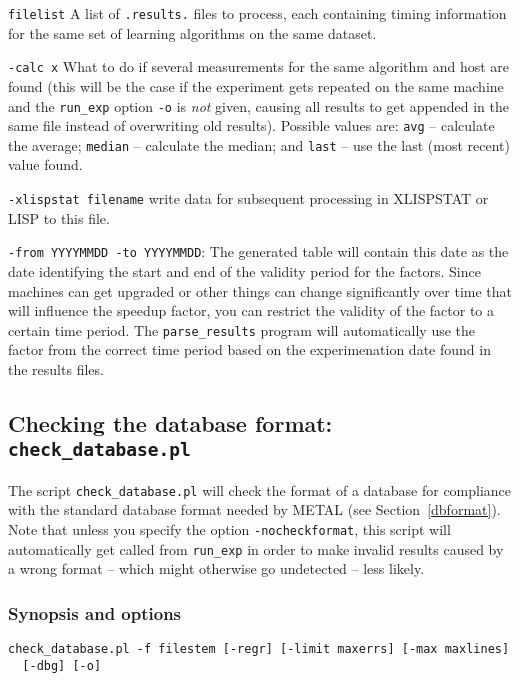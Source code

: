 \documentclass[a4paper,10pt,twoside]{article}
\newenvironment{optionlist}
{\begin{list}{}
    {\setlength{\itemsep}{0em plus0em minus0ex}
      \setlength{\parsep}{0ex}
      \setlength{\topsep}{0em}
      \setlength{\leftmargin}{2em}
      \setlength{\listparindent}{0em}
      \setlength{\itemindent}{-2em}
      \setlength{\partopsep}{0ex}
    }}
  {\end{list}}
\begin{document}
\begin{optionlist}
\item \verb=filelist= A list of \verb=.results.= files to process, each 
containing timing information for the same set of learning algorithms
on the same dataset. 
\item \verb=-calc x= What to do if several measurements for the
same algorithm and host are found (this will be the case if the 
experiment gets repeated on the same machine and the \verb=run_exp=
option \verb=-o= is \emph{not} given, causing all results to get
appended in the same file instead of overwriting old results).
Possible values are: \verb=avg= -- calculate the average; \verb=median= --
calculate the median; and \verb=last= -- use the last (most recent)
value found.
\item \verb=-xlispstat filename= write data for subsequent processing
in XLISPSTAT or LISP to this file.
\item \verb=-from YYYYMMDD -to YYYYMMDD=: The generated table will 
contain this date
as the date identifying the start and end
 of the validity period for the factors.
Since machines can get upgraded or other things can change significantly
over time that will influence the speedup factor, you can restrict the
validity of the factor to a certain time period. The \verb=parse_results=
program will automatically use the factor from the correct time period
based on the experimenation date found in the results files.
\end{optionlist}

\subsection{Checking the database format: \texttt{check\_database.pl}}

The script \verb=check_database.pl= will check the format of a
database for compliance with the standard database 
format needed by METAL (see 
Section~\ref{dbformat}). 
Note that unless you specify the option \verb=-nocheckformat=, this
script will automatically get called from \verb=run_exp= in order 
to make invalid results caused by a wrong format -- which might
otherwise go undetected -- less likely.

\subsubsection{Synopsis and options}

\begin{verbatim}
check_database.pl -f filestem [-regr] [-limit maxerrs] [-max maxlines] 
  [-dbg] [-o]
\end{verbatim}
\end{document}
